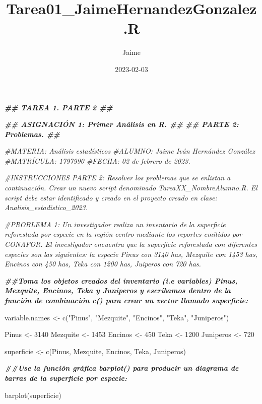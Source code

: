 \documentclass[
]{article}
\title{Tarea01\_JaimeHernandezGonzalez.R}
\author{Jaime}
\date{2023-02-03}
\newenvironment{Shaded}{\begin{snugshade}}{\end{snugshade}}
\newcommand{\CommentTok}[1]{\textcolor[rgb]{0.56,0.35,0.01}{\textit{#1}}}
\newcommand{\DecValTok}[1]{\textcolor[rgb]{0.00,0.00,0.81}{#1}}
\newcommand{\DocumentationTok}[1]{\textcolor[rgb]{0.56,0.35,0.01}{\textbf{\textit{#1}}}}
\newcommand{\FunctionTok}[1]{\textcolor[rgb]{0.00,0.00,0.00}{#1}}
\newcommand{\NormalTok}[1]{#1}
\newcommand{\OtherTok}[1]{\textcolor[rgb]{0.56,0.35,0.01}{#1}}
\newcommand{\StringTok}[1]{\textcolor[rgb]{0.31,0.60,0.02}{#1}}
\begin{document}
\maketitle

\begin{Shaded}
\begin{Highlighting}[]
                       \DocumentationTok{\#\# TAREA 1. PARTE 2 \#\#}

             \DocumentationTok{\#\# ASIGNACIÓN 1: Primer Análisis en R. \#\#}
                      \DocumentationTok{\#\# PARTE 2: Problemas. \#\#}

\CommentTok{\#MATERIA: Análisis estadísticos}
\CommentTok{\#ALUMNO: Jaime Iván Hernández González}
\CommentTok{\#MATRÍCULA: 1797990}
\CommentTok{\#FECHA: 02 de febrero de 2023.}

\CommentTok{\#INSTRUCCIONES PARTE 2: Resolver los problemas que se enlistan a continuación. Crear un nuevo script denominado TareaXX\_NombreAlumno.R. El script debe estar identificado y creado en el proyecto creado en clase: Analisis\_estadistico\_2023.}


\CommentTok{\#PROBLEMA 1: Un investigador realiza un inventario de la superficie reforestada por especie en la región centro mediante los reportes emitidos por CONAFOR. El investigador encuentra que la superficie reforestada con diferentes especies son las siguientes: la especie Pinus con 3140 has, Mezquite con 1453 has, Encinos con 450 has, Teka con 1200 has, Juiperos con 720 has.}

\DocumentationTok{\#\#Toma los objetos creados del inventario (i.e variables) Pinus, Mexquite, Encinos, Teka y Juniperos y escribamos dentro de la función de combinación c() para crear un vector llamado superficie:}

\NormalTok{variable.names }\OtherTok{\textless{}{-}} \FunctionTok{c}\NormalTok{(}\StringTok{"Pinus"}\NormalTok{, }\StringTok{"Mezquite"}\NormalTok{, }\StringTok{"Encinos"}\NormalTok{, }\StringTok{"Teka"}\NormalTok{, }\StringTok{"Juniperos"}\NormalTok{)}

\NormalTok{Pinus }\OtherTok{\textless{}{-}} \DecValTok{3140}
\NormalTok{Mezquite }\OtherTok{\textless{}{-}} \DecValTok{1453}
\NormalTok{Encinos }\OtherTok{\textless{}{-}} \DecValTok{450}
\NormalTok{Teka }\OtherTok{\textless{}{-}} \DecValTok{1200}
\NormalTok{Juniperos }\OtherTok{\textless{}{-}} \DecValTok{720}

\NormalTok{superficie }\OtherTok{\textless{}{-}} \FunctionTok{c}\NormalTok{(Pinus, Mezquite, Encinos, Teka, Juniperos)}

\DocumentationTok{\#\#Use la función gráfica barplot() para producir un diagrama de barras de la superficie por especie:}

\FunctionTok{barplot}\NormalTok{(superficie)}
\end{Highlighting}
\end{Shaded}
\end{document}
